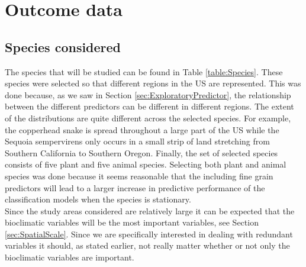 \section{Outcome data}
\label{sec:OutcomeData}
\subsection{Species considered}
The species that will be studied can be found in Table \ref{table:Species}. These species were selected so that different regions in the US are represented. This was done because, as we saw in Section \ref{sec:ExploratoryPredictor}, the relationship between the different predictors can be different in different regions. The extent of the distributions are quite different across the selected species. For example, the copperhead snake is spread throughout a large part of the US while the Sequoia sempervirens only occurs in a small strip of land stretching from Southern California to Southern Oregon. Finally, the set of selected species consists of five plant and five animal species. Selecting both plant and animal species was done because it seems reasonable that the including fine grain predictors will lead to a larger increase in predictive performance of the classification models when the species is stationary.\\

Since the study areas considered are relatively large it can be expected that the bioclimatic variables will be the most important variables, see Section \ref{sec:SpatialScale}. Since we are specifically interested in dealing with redundant variables it should, as stated earlier, not really matter whether or not only the bioclimatic variables are important.

